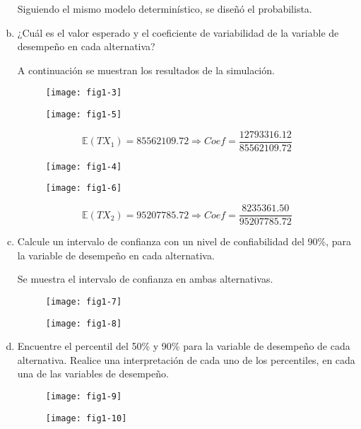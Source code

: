 \documentclass[../main.tex]{subfiles}
\begin{document}
\begin{enumerate}[(a)]
Siguiendo el mismo modelo determinístico, se diseñó el probabilista.

\item ¿Cuál es el valor esperado y el coeficiente de variabilidad de la variable
de desempeño en cada alternativa?

A continuación se muestran los resultados de la simulación.

\begin{figure}[h]
\centering
\texttt{[image: fig1-3]}
\label{fig:img1}
\end{figure}
\begin{figure}[h]
\centering
\texttt{[image: fig1-5]}
\label{fig:img1}
\end{figure}

$$\mathbb{E}(TX_{1}) = 85562109.72 \Rightarrow Coef = \frac{12793316.12}{85562109.72}$$

\pagebreak

\begin{figure}[h]
\centering
\texttt{[image: fig1-4]}
\label{fig:img1}
\end{figure}
\begin{figure}[h]
\centering
\texttt{[image: fig1-6]}
\label{fig:img1}
\end{figure}

$$\mathbb{E}(TX_{2}) = 95207785.72 \Rightarrow Coef = \frac{8235361.50}{95207785.72}$$

\pagebreak

\item Calcule un intervalo de confianza con un nivel de confiabilidad del 90\%,
para la variable de desempeño en cada alternativa.

Se muestra el intervalo de confianza en ambas alternativas.

\begin{figure}[h]
\centering
\texttt{[image: fig1-7]}
\label{fig:img1}
\end{figure}
\begin{figure}[h]
\centering
\texttt{[image: fig1-8]}
\label{fig:img1}
\end{figure}

\pagebreak

\item Encuentre el percentil del 50\% y 90\% para la variable de desempeño de
cada alternativa. Realice una interpretación de cada uno de los percentiles, en cada
una de las variables de desempeño.

\begin{figure}[h]
\centering
\texttt{[image: fig1-9]}
\label{fig:img1}
\end{figure}
\begin{figure}[h]
\centering
\texttt{[image: fig1-10]}
\label{fig:img1}
\end{figure}


\end{enumerate}
\end{document}
